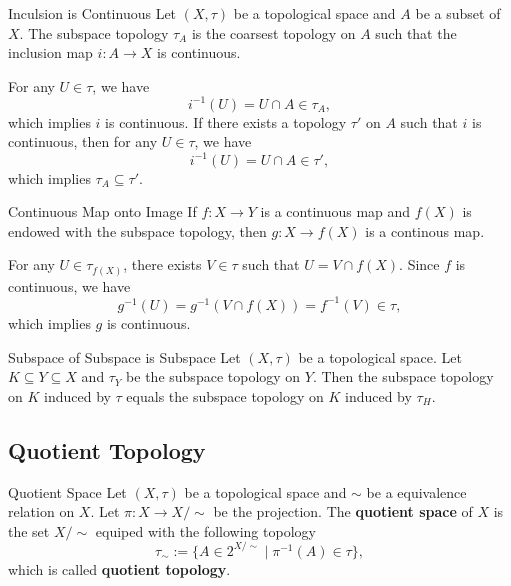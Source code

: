 \documentclass{report}
\begin{document}
\begin{proposition}{Inculsion is Continuous}{}
	Let $(X,\tau)$ be a topological space and $A$ be a subset of $X$. The subspace topology $\tau_A$ is the coarsest topology on $A$ such that the inclusion map $i:A\to X$ is continuous.
\end{proposition}

\begin{prf}
	For any $U\in \tau$, we have
	\[
		i^{-1}(U)=U\cap A\in \tau_A,
	\]
	which implies $i$ is continuous. If there exists a topology $\tau'$ on $A$ such that $i$ is continuous, then for any $U\in \tau$, we have
	\[
		i^{-1}(U)=U\cap A\in \tau',
	\]
	which implies $\tau_A\subseteq \tau'$.
\end{prf}


\begin{proposition}{Continuous Map onto Image}{}
	If $f:X\to Y$ is a continuous map and $f(X)$ is endowed with the subspace topology, then $g:X\to f(X)$ is a continous map.
\end{proposition}

\begin{prf}
	For any $U\in \tau_{f(X)}$, there exists $V\in \tau$ such that $U=V\cap f(X)$. Since $f$ is continuous, we have
	\[
		g^{-1}(U)=g^{-1}\left(V\cap f(X)\right)=f^{-1}(V)\in \tau,
	\]
	which implies $g$ is continuous.
\end{prf}



\begin{proposition}{Subspace of Subspace is Subspace}{}
	Let $(X, \tau)$ be a topological space. Let $K \subseteq Y \subseteq X$ and $\tau_Y$ be the subspace topology on $Y$. Then the subspace topology on $K$ induced by $\tau$ equals the subspace topology on $K$ induced by $\tau_H$.
\end{proposition}

\subsection{Quotient Topology}
\begin{definition}{Quotient Space}{}
	Let $(X,\tau)$ be a topological space and $\sim$ be a equivalence relation on $X$. Let $\pi:X\to X/\sim$ be the projection.
	The \textbf{quotient space} of $X$ is the set $X/\sim$ equiped with the following topology
	\[
		\tau_\sim:=\{A\in 2^{X/\sim}\mid \pi^{-1}(A)\in \tau\},
	\]
	which is called \textbf{quotient topology}.
\end{definition}
\end{document}
